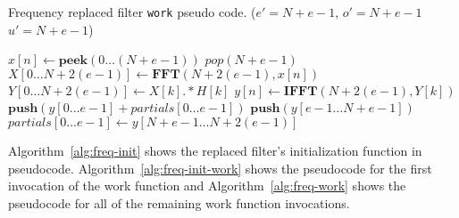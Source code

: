 \begin{algorithm}
  \caption{Frequency replaced filter {\tt work} pseudo code. 
    ($e'=N+e-1$, $o'=N+e-1$ $u'=N+e-1$)\label{alg:freq-work}}
  \begin{algorithmic}
    \STATE $x[n] \leftarrow \mathbf{peek}(0 \dots (N+e-1))$
    \STATE $pop(N+e-1)$
    \STATE $X[0 \dots N+2(e-1)] \leftarrow \mathbf{FFT} (N+2(e-1), x[n])$
    \STATE $Y[0 \dots N+2(e-1)] \leftarrow X[k] .* H[k]$
    \STATE $y[n] \leftarrow \mathbf{IFFT}(N+2(e-1), Y[k])$
    \STATE $\mathbf{push}(y[0 \dots e-1] + partials[0 \dots e-1])$
    \STATE $\mathbf{push}(y[e-1 \dots N+e-1])$
    \STATE $partials[0 \dots e-1] \leftarrow y[N+e-1 \dots N+2(e-1)]$
  \end{algorithmic}
\end{algorithm}

Algorithm~\ref{alg:freq-init} shows the replaced filter's initialization
function in pseudocode. Algorithm~\ref{alg:freq-init-work} shows the 
pseudocode for the first invocation of the work function and
Algorithm~\ref{alg:freq-work} shows the pseudocode for all of the 
remaining work function invocations. 




